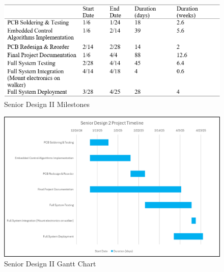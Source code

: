 \begin{figure}[H]
	\centering
	\includegraphics[width=\textwidth]{./Images/SD2mile.png}
	\caption{\label{fig:SD2mile}Senior Design II Milestones}
\end{figure}

\begin{figure}[H]
	\centering
	\includegraphics[width=\textwidth]{./Images/SD2gantt.png}
	\caption{\label{fig:SD2gantt}Senior Design II Gantt Chart}
\end{figure}